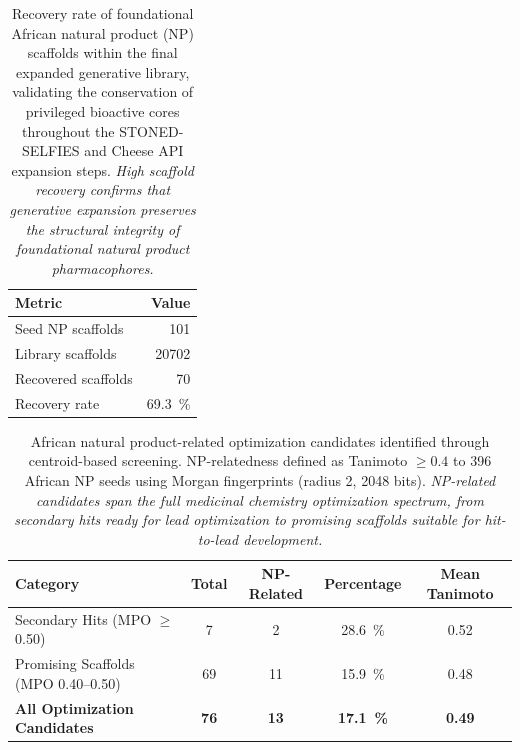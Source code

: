 \documentclass[journal=jcisd8,manuscript=suppinfo]{achemso}
\begin{document}
\begin{table}[htbp]
\centering
\caption{Recovery rate of foundational African natural product (NP) scaffolds within the final expanded generative library, validating the conservation of privileged bioactive cores throughout the STONED-SELFIES and Cheese API expansion steps. \textit{High scaffold recovery confirms that generative expansion preserves the structural integrity of foundational natural product pharmacophores.}}
\label{tab:scaffold_recovery}
\begin{tabular}{@{}l r@{}}
\toprule
\textbf{Metric} & \textbf{Value} \\
\midrule
Seed NP scaffolds & \num{101} \\
Library scaffolds & \num{20702} \\
Recovered scaffolds & \num{70} \\
Recovery rate & \qty{69.3}{\percent} \\
\bottomrule
\end{tabular}
\end{table}

\begin{table}[htbp]
\centering
\caption{African natural product-related optimization candidates identified through centroid-based screening. NP-relatedness defined as Tanimoto $\geq \num{0.4}$ to \num{396} African NP seeds using Morgan fingerprints (radius 2, 2048 bits). \textit{NP-related candidates span the full medicinal chemistry optimization spectrum, from secondary hits ready for lead optimization to promising scaffolds suitable for hit-to-lead development.}}
\label{tab:np_related_summary}
\begin{tabular}{@{}lcccc@{}}
\toprule
\textbf{Category} & \textbf{Total} & \textbf{NP-Related} & \textbf{Percentage} & \textbf{Mean Tanimoto} \\
\midrule
Secondary Hits (MPO $\geq$ 0.50) & \num{7} & \num{2} & \qty{28.6}{\percent} & \num{0.52} \\
Promising Scaffolds (MPO 0.40--0.50) & \num{69} & \num{11} & \qty{15.9}{\percent} & \num{0.48} \\
\midrule
\textbf{All Optimization Candidates} & \textbf{\num{76}} & \textbf{\num{13}} & \textbf{\qty{17.1}{\percent}} & \textbf{\num{0.49}} \\
\bottomrule
\end{tabular}
\end{table}
\end{document}
